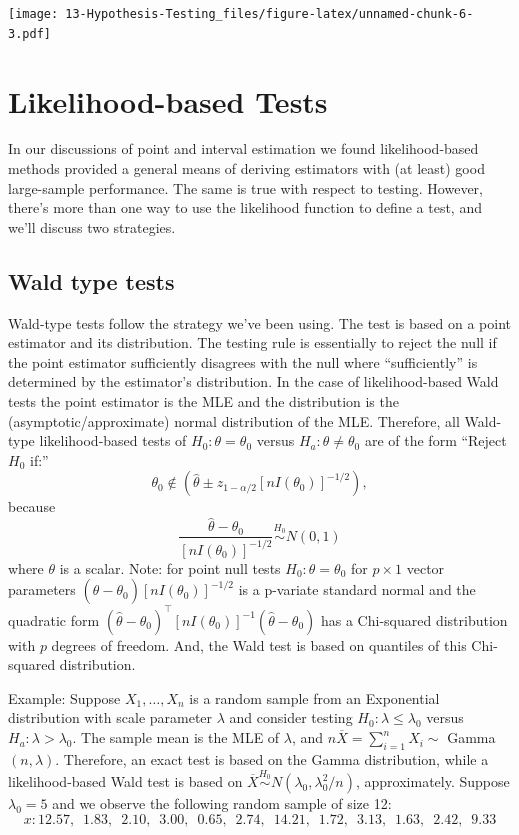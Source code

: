 \documentclass[
]{book}
\begin{document}
\texttt{[image: 13-Hypothesis-Testing\_files/figure-latex/unnamed-chunk-6-3.pdf]}

\hypertarget{likelihood-based-tests}{%
\section{Likelihood-based Tests}\label{likelihood-based-tests}}

In our discussions of point and interval estimation we found likelihood-based methods provided a general means of deriving estimators with (at least) good large-sample performance. The same is true with respect to testing. However, there's more than one way to use the likelihood function to define a test, and we'll discuss two strategies.

\hypertarget{wald-type-tests}{%
\subsection{Wald type tests}\label{wald-type-tests}}

Wald-type tests follow the strategy we've been using. The test is based on a point estimator and its distribution. The testing rule is essentially to reject the null if the point estimator sufficiently disagrees with the null where ``sufficiently'' is determined by the estimator's distribution. In the case of likelihood-based Wald tests the point estimator is the MLE and the distribution is the (asymptotic/approximate) normal distribution of the MLE. Therefore, all Wald-type likelihood-based tests of \(H_0:\theta = \theta_0\) versus \(H_a:\theta\ne \theta_0\) are of the form ``Reject \(H_0\) if:''
\[\theta_0 \notin (\hat\theta \pm z_{1-\alpha/2}[nI(\theta_0)]^{-1/2}),\]
because
\[\frac{\hat\theta - \theta_0}{[nI(\theta_0)]^{-1/2}}\stackrel{H_0}{\sim}N(0,1)\]
where \(\theta\) is a scalar.
Note: for point null tests \(H_0:\theta=\theta_0\) for \(p\times 1\) vector parameters \((\hat\theta-\theta_0)[nI(\theta_0)]^{-1/2}\) is a p-variate standard normal and the quadratic form \((\hat\theta-\theta_0)^{\top}[nI(\theta_0)]^{-1} (\hat\theta-\theta_0)\) has a Chi-squared distribution with \(p\) degrees of freedom. And, the Wald test is based on quantiles of this Chi-squared distribution.

Example: Suppose \(X_1, \ldots, X_n\) is a random sample from an Exponential distribution with scale parameter \(\lambda\) and consider testing \(H_0:\lambda \leq \lambda_0\) versus \(H_a:\lambda > \lambda_0\). The sample mean is the MLE of \(\lambda\), and \(n\overline X= \sum_{i=1}^nX_i \sim\) Gamma\((n, \lambda)\). Therefore, an exact test is based on the Gamma distribution, while a likelihood-based Wald test is based on \(\overline X \stackrel{H_0}{\sim}N(\lambda_0,\lambda_0^2/n)\), approximately. Suppose \(\lambda_0 = 5\) and we observe the following random sample of size 12:
\[x : 12.57,\,\,\,  1.83,\,\,\,  2.10,\,\,\,  3.00,\,\,\,  0.65,\,\,\,  2.74,\,\,\, 14.21,\,\,\,  1.72,\,\,\,  3.13,\,\,\,  1.63,\,\,\,  2.42,\,\,\,  9.33\]
\end{document}
